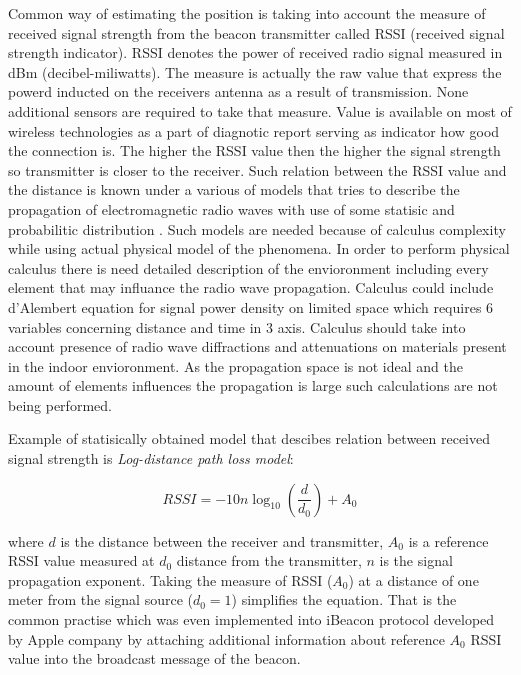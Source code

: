 \documentclass[../main.tex]{subfiles}
\begin{document}
Common way of estimating the position is taking into account the measure of received signal strength from the beacon transmitter called RSSI (received signal strength indicator). RSSI denotes the power of received radio signal measured in dBm (decibel-miliwatts). The measure is actually the raw value that express the powerd inducted on the receivers antenna as a result of transmission. None additional sensors are required to take that measure. Value is available on most of wireless technologies as a part of diagnotic report serving as indicator how good the connection is. The higher the RSSI value then the higher the signal strength so transmitter is closer to the receiver. Such relation between the RSSI value and the distance is known under a various of models that tries to describe the propagation of electromagnetic radio waves with use of some statisic and probabilitic distribution \cite{RSSI_path_loss_prediction_model}. Such models are needed because of calculus complexity while using actual physical model of the phenomena. In order to perform physical calculus there is need detailed description of the envioronment including every element that may influance the radio wave propagation. Calculus could include d'Alembert equation for signal power density on limited space which requires 6 variables concerning distance and time in 3 axis. Calculus should take into account presence of radio wave diffractions and attenuations on materials present in the indoor envioronment. As the propagation space is not ideal and the amount of elements influences the propagation is large such calculations are not being performed.

Example of statisically obtained model that descibes relation between received signal strength is \textit{Log-distance path loss model}:

\begin{equation}
\label{eq:log-distance-model}
	RSSI = -10 n \log_{10} (\frac{d}{d_0}) + A_0
\end{equation}



where $ d $ is the distance between the receiver and transmitter, $A_0$ is a reference RSSI value measured at $d_0$ distance from the transmitter, $n$ is the signal propagation exponent. Taking the measure of RSSI ($A_0$) at a distance of one meter from the signal source ($d_0 = 1$) simplifies the equation. That is the common practise which was even implemented into iBeacon protocol developed by Apple company by attaching additional information about reference $A_0$ RSSI value into the broadcast message of the beacon.
\end{document}
